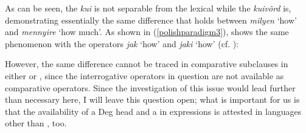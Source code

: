 \ea \label{estonian3}
\z
\z
	
As can be seen, the  \textit{kui} is not separable from the lexical  while the  \textit{kuivõrd} is, demonstrating essentially the same difference that holds between  \textit{milyen} `how' and \textit{mennyire} `how much'. As shown in (\ref{polishparadigm3}),  shows the same phenomenon with the operators \textit{jak} `how' and \textit{jaki} `how' (cf. \citealt[81]{borsleyjaworska1981}):

\ea \label{polishparadigm3}
\z
\z

However, the same difference cannot be traced in comparative subclauses in either  or , since the interrogative operators in question are not available as comparative operators. Since the investigation of this issue would lead further than necessary here, I will leave this question open; what is important for us is that the availability of a Deg head  and a    in  expressions is attested in languages other than , too.


